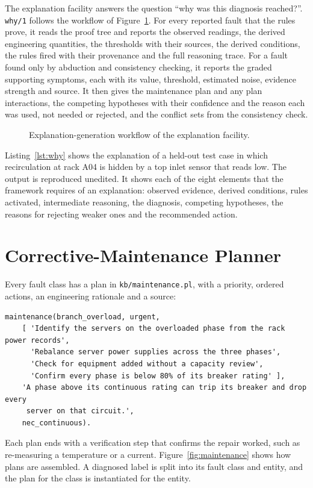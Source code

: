 The explanation facility answers the question ``why was this diagnosis reached?''. \texttt{why/1} follows the workflow of Figure~\ref{fig:explanation}. For every reported fault that the rules prove, it reads the proof tree and reports the observed readings, the derived engineering quantities, the thresholds with their sources, the derived conditions, the rules fired with their provenance and the full reasoning trace. For a fault found only by abduction and consistency checking, it reports the graded supporting symptoms, each with its value, threshold, estimated noise, evidence strength and source. It then gives the maintenance plan and any plan interactions, the competing hypotheses with their confidence and the reason each was used, not needed or rejected, and the conflict sets from the consistency check.

\begin{figure}[htbp]
  \centering
  
  \caption{Explanation-generation workflow of the explanation facility.}
  \label{fig:explanation}
\end{figure}

Listing~\ref{lst:why} shows the explanation of a held-out test case in which recirculation at rack A04 is hidden by a top inlet sensor that reads low. The output is reproduced unedited. It shows each of the eight elements that the framework requires of an explanation: observed evidence, derived conditions, rules activated, intermediate reasoning, the diagnosis, competing hypotheses, the reasons for rejecting weaker ones and the recommended action.



\section{Corrective-Maintenance Planner}
\label{sec:planner}

Every fault class has a plan in \texttt{kb/maintenance.pl}, with a priority, ordered actions, an engineering rationale and a source:
\begin{lstlisting}
maintenance(branch_overload, urgent,
    [ 'Identify the servers on the overloaded phase from the rack power records',
      'Rebalance server power supplies across the three phases',
      'Check for equipment added without a capacity review',
      'Confirm every phase is below 80% of its breaker rating' ],
    'A phase above its continuous rating can trip its breaker and drop every
     server on that circuit.',
    nec_continuous).
\end{lstlisting}
Each plan ends with a verification step that confirms the repair worked, such as re-measuring a temperature or a current. Figure~\ref{fig:maintenance} shows how plans are assembled. A diagnosed label is split into its fault class and entity, and the plan for the class is instantiated for the entity.

